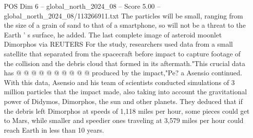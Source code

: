\begin{textsample}{POS Dim 6 – global\_north\_2024\_08 – Score 5.00 – global\_north\_2024\_08/113266911.txt}
The particles will be small, ranging from the size of a grain of sand to that of a smartphone, so will not be a threat to the Earth ' s surface, he added.
The last complete image of asteroid moonlet Dimorphos via REUTERS For the study, researchers used data from a small satellite that separated from the spacecraft before impact to capture footage of the collision and the debris cloud that formed in its aftermath."This crucial data has @ @ @ @ @ @ @ @ @ @ produced by the impact,"Pe? a Asensio continued.
With this data, Asensio and his team of scientists conducted simulations of 3 million particles that the impact made, also taking into account the gravitational power of Didymos, Dimorphos, the sun and other planets.
They deduced that if the debris left Dimorphos at speeds of 1,118 miles per hour, some pieces could get to Mars, while smaller and speedier ones traveling at 3,579 miles per hour could reach Earth in less than 10 years.

\end{textsample}
